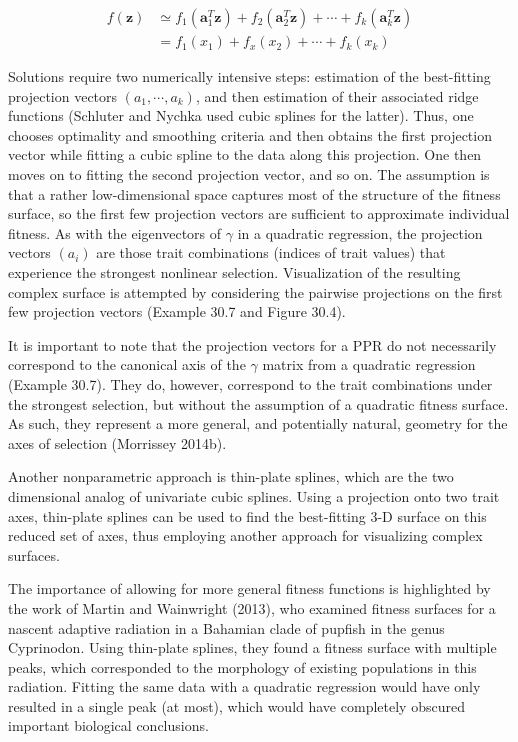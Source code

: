 \documentclass{article}
\begin{document}
\begin{equation}
\begin{aligned}f(\mathbf{z})&\simeq f_{1}(\mathbf{a}_{1}^{T}\mathbf{z})+f_{2}(\mathbf{a}_{2}^{T}\mathbf{z})+\cdots+f_{k}(\mathbf{a}_{k}^{T}\mathbf{z})\\&=f_{1}(x_{1})+f_{x}(x_{2})+\cdots+f_{k}(x_{k})\end{aligned}
\tag{30.29}
\label{eq:30_29}
\end{equation}

Solutions require two numerically intensive steps: estimation of the best-fitting projection vectors  $ (a_1, \cdots, a_k) $, and then estimation of their associated ridge functions (Schluter and Nychka used cubic splines for the latter). Thus, one chooses optimality and smoothing criteria and then obtains the first projection vector while fitting a cubic spline to the data along this projection. One then moves on to fitting the second projection vector, and so on. The assumption is that a rather low-dimensional space captures most of the structure of the fitness surface, so the first few projection vectors are sufficient to approximate individual fitness. As with the eigenvectors of  $ \gamma $ in a quadratic regression, the projection vectors  $ (a_i) $ are those trait combinations (indices of trait values) that experience the strongest nonlinear selection. Visualization of the resulting complex surface is attempted by considering the pairwise projections on the first few projection vectors (Example 30.7 and Figure 30.4).

It is important to note that the projection vectors for a PPR do not necessarily correspond to the canonical axis of the  $ \gamma $ matrix from a quadratic regression (Example 30.7). They do, however, correspond to the trait combinations under the strongest selection, but without the assumption of a quadratic fitness surface. As such, they represent a more general, and potentially natural, geometry for the axes of selection (Morrissey 2014b).

Another nonparametric approach is thin-plate splines, which are the two dimensional analog of univariate cubic splines. Using a projection onto two trait axes, thin-plate splines can be used to find the best-fitting 3-D surface on this reduced set of axes, thus employing another approach for visualizing complex surfaces.

The importance of allowing for more general fitness functions is highlighted by the work of Martin and Wainwright (2013), who examined fitness surfaces for a nascent adaptive radiation in a Bahamian clade of pupfish in the genus Cyprinodon. Using thin-plate splines, they found a fitness surface with multiple peaks, which corresponded to the morphology of existing populations in this radiation. Fitting the same data with a quadratic regression would have only resulted in a single peak (at most), which would have completely obscured important biological conclusions.
\end{document}
